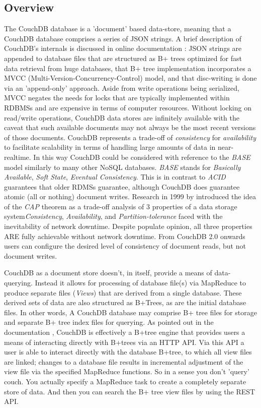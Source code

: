 \subsection{Overview}
The CouchDB database is a 'document' based data-store, meaning that a CouchDB database comprises a series of JSON strings. A brief description of CouchDB's internals is discussed in online documentation \cite{couchguide}: JSON strings are appended to database files that are structured as B+ trees optimized for fast data retrieval from huge databases, that B+ tree implementation incorporates a MVCC (Multi-Version-Concurrency-Control) model, and that disc-writing is done via an 'append-only' approach. Aside from write operations being serialized, MVCC negates the needs for locks that are typically implemented within RDBMSs and are expensive in terms of computer resources. Without locking on read/write operations, CouchDB data stores are infinitely available with the caveat that such available documents may not always be the most recent versions of those documents. CouchDB represents a trade-off of \textit{consistency} for \textit{availability} to facilitate scalability in terms of handling large amounts of data in near-realtime. In this way CouchDB could be considered with reference to the \textit{BASE} model similarly to many other NoSQL databases. \textit{BASE} stands for \textit{Basically Available}, \textit{Soft State}, \textit{Eventual Consistency}. This is in contrast to \textit{ACID} guarantees that older RDMSs guarantee, although CouchDB does guarantee atomic (all or nothing) document writes. Research in 1999 by \cite{cap} introduced the idea of the \textit{CAP} theorem as a trade-off analysis of 3 properties of a data storage system\textit{Consistency}, \textit{Availability}, and \textit{Partition-tolerance} faced with the inevitability of network downtime. Despite populate opinion, all three properties ARE fully achievable without network downtime. From CouchDB 2.0 onwards users can configure the desired level of consistency of document reads, but not document writes.

CouchDB as a document store doesn't, in itself, provide a means of data-querying. Instead it allows for processing of database file(s) via MapReduce to produce separate files (\textit{Views}) that are derived from a single database. These derived sets of data are also structured as B+Trees, as are the initial database files. In other words, A CouchDB database may comprise B+ tree files for storage and separate B+ tree index files for querying. As pointed out in the documentation \cite{couchguide}, CouchDB is effectively a B+tree engine that provides users a means of interacting directly with B+trees via an HTTP API. Via this API a user is able to interact directly with the database B+tree, to which all view files are linked; changes to a database file results in incremental adjustment of the view file via the specified MapReduce functions. So in a sense you don’t 'query' couch. You actually specify a MapReduce task to create a completely separate store of data. And then you can search the B+ tree view files by using the REST API.

